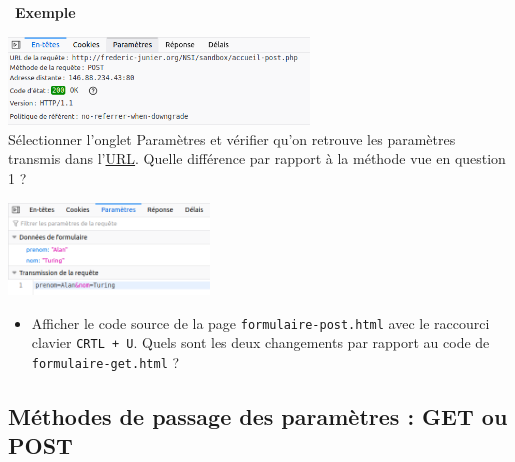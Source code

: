 \documentclass[
  11pt,
]{article}
\newcommand{\passthrough}[1]{#1}
\providecommand{\tightlist}{%
  \setlength{\itemsep}{0pt}\setlength{\parskip}{0pt}}
\newcounter{exple}
\newenvironment{exemple}[1]
{\par \medskip   \addtocounter{exple}{1} \noindent  
\begin{bclogo}[arrondi =0.1,   noborder = true, logo=\bclampe, marge=4]{~\textbf{Exemple} \textbf{\theexple} {\itshape #1} }  \par}
{
\end{bclogo}
 \par \bigskip }
\begin{document}
\begin{exemple}{}
\begin{enumerate}
  \includegraphics[width=0.6\textwidth,height=\textheight]{images/entete-post.png}\\

  Sélectionner l'onglet Paramètres et vérifier qu'on retrouve les
  paramètres transmis dans
  l'\href{https://developer.mozilla.org/fr/docs/Glossaire/URL}{URL}.
  Quelle différence par rapport à la méthode vue en question 1 ?

  \includegraphics[width=0.4\textwidth,height=\textheight]{images/parametres2.png}\\

  \begin{itemize}
  \tightlist
  \item
    Afficher le code source de la page
    \passthrough{\lstinline!formulaire-post.html!} avec le raccourci
    clavier \passthrough{\lstinline!CRTL + U!}. Quels sont les deux
    changements par rapport au code de
    \passthrough{\lstinline!formulaire-get.html!} ?
  \end{itemize}
\end{enumerate}

\end{exemple}

\hypertarget{muxe9thodes-de-passage-des-paramuxe8tres-get-ou-post}{%
\subsection{Méthodes de passage des paramètres : GET ou
POST}\label{muxe9thodes-de-passage-des-paramuxe8tres-get-ou-post}}
\end{document}
